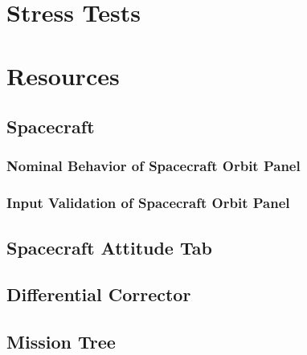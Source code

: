 \chapter{Stress Tests}





\chapter{Resources}

\section{Spacecraft}

\subsection{Nominal Behavior of Spacecraft Orbit Panel}













\clearpage
















\subsection{Input Validation of Spacecraft Orbit Panel}

\section{Spacecraft Attitude Tab}



\clearpage
\section{Differential Corrector}



\section{Mission Tree}

%

%
%
%
%

